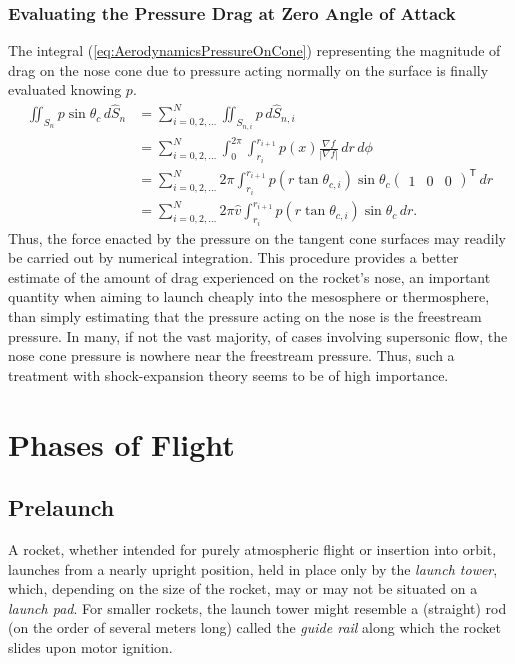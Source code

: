\documentclass[11pt,dvipsnames]{thesis}
\begin{document}
\subsection{Evaluating the Pressure Drag at Zero Angle of Attack}
The integral (\ref{eq:AerodynamicsPressureOnCone}) representing the magnitude of drag on the nose cone due to pressure acting normally on the surface is finally evaluated knowing $p$.
\begin{align}
\iint_{S_n} p \sin\theta_c \,d\hat{S}_n &= \sum_{i = 0,2,\ldots}^N \iint_{S_{n,i}} p \,d\hat{S}_{n,i} \\
&= \sum_{i = 0,2,\ldots}^N \int_0^{2\pi} \int_{r_i}^{r_{i+1}} p(x) \frac{\nabla f}{|\nabla f|} \,dr\,d\phi \\
&= \sum_{i = 0,2,\ldots}^N 2\pi \int_{r_i}^{r_{i+1}} p(r\tan\theta_{c,i}) \sin\theta_c \begin{pmatrix}1 & 0 & 0\end{pmatrix}^\mathsf{T} \,dr \\
&= \sum_{i = 0,2,\ldots}^N 2\pi\hat{v} \int_{r_i}^{r_{i+1}} p(r\tan\theta_{c,i}) \sin\theta_c \,dr.
\end{align}
Thus, the force enacted by the pressure on the tangent cone surfaces may readily be carried out by numerical integration. This procedure provides a better estimate of the amount of drag experienced on the rocket's nose, an important quantity when aiming to launch cheaply into the mesosphere or thermosphere, than simply estimating that the pressure acting on the nose is the freestream pressure. In many, if not the vast majority, of cases involving supersonic flow, the nose cone pressure is nowhere near the freestream pressure. Thus, such a treatment with shock-expansion theory seems to be of high importance.





\chapter{Phases of Flight}
\section{Prelaunch}
A rocket, whether intended for purely atmospheric flight or insertion into orbit, launches from a nearly upright position, held in place only by the \textit{launch tower}, which, depending on the size of the rocket, may or may not be situated on a \textit{launch pad}. For smaller rockets, the launch tower might resemble a (straight) rod (on the order of several meters long) called the \textit{guide rail} along which the rocket slides upon motor ignition.
\end{document}
